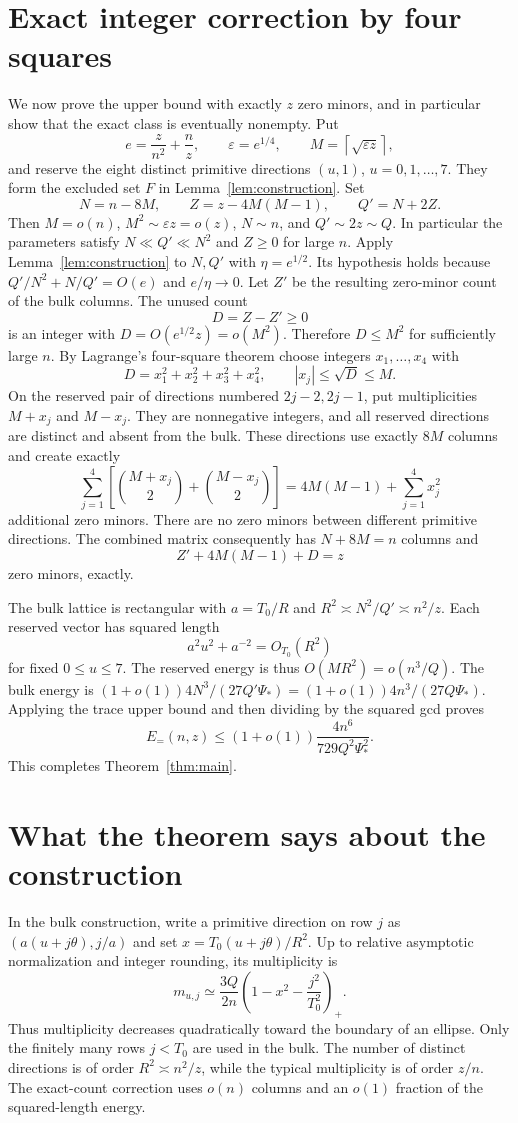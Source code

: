 \documentclass[11pt]{article}
\theoremstyle{remark}\newtheorem{remark}[theorem]{Remark}
\newcommand{\ep}{\varepsilon}
\begin{document}
\section{Exact integer correction by four squares}
We now prove the upper bound with exactly $z$ zero minors, and in particular show that the exact class is eventually nonempty.
Put
\[
 e=\frac{z}{n^2}+\frac{n}{z},\qquad \ep=e^{1/4},\qquad
 M=\left\lceil\sqrt{\ep z}\right\rceil,
\]
and reserve the eight distinct primitive directions $(u,1)$, $u=0,1,\ldots,7$. They form the excluded set $F$ in Lemma~\ref{lem:construction}. Set
\[
 N=n-8M,\qquad Z=z-4M(M-1),\qquad Q'=N+2Z.
\]
Then $M=o(n)$, $M^2\sim\ep z=o(z)$, $N\sim n$, and $Q'\sim2z\sim Q$. In particular the parameters satisfy $N\ll Q'\ll N^2$ and $Z\ge0$ for large $n$. Apply Lemma~\ref{lem:construction} to $N,Q'$ with $\eta=e^{1/2}$. Its hypothesis holds because $Q'/N^2+N/Q'=O(e)$ and $e/\eta\to0$.
Let $Z'$ be the resulting zero-minor count of the bulk columns. The unused count
\[
 D=Z-Z'\ge0
\]
is an integer with $D=O(e^{1/2}z)=o(M^2)$. Therefore $D\le M^2$ for sufficiently large $n$. By Lagrange's four-square theorem choose integers $x_1,\ldots,x_4$ with
\[
 D=x_1^2+x_2^2+x_3^2+x_4^2,
 \qquad |x_j|\le\sqrt D\le M.
\]
On the reserved pair of directions numbered $2j-2,2j-1$, put multiplicities $M+x_j$ and $M-x_j$. They are nonnegative integers, and all reserved directions are distinct and absent from the bulk. These directions use exactly $8M$ columns and create exactly
\[
 \sum_{j=1}^4\left[\binom{M+x_j}{2}+\binom{M-x_j}{2}\right]
 =4M(M-1)+\sum_{j=1}^4x_j^2
\]
additional zero minors. There are no zero minors between different primitive directions. The combined matrix consequently has $N+8M=n$ columns and
\[
 Z'+4M(M-1)+D=z
\]
zero minors, exactly.

The bulk lattice is rectangular with $a=T_0/R$ and $R^2\asymp N^2/Q'\asymp n^2/z$. Each reserved vector has squared length
\[
 a^2u^2+a^{-2}=O_{T_0}(R^2)
\]
for fixed $0\le u\le7$. The reserved energy is thus $O(MR^2)=o(n^3/Q)$. The bulk energy is $(1+o(1))4N^3/(27Q'\Psi_*)=(1+o(1))4n^3/(27Q\Psi_*)$. Applying the trace upper bound and then dividing by the squared gcd proves
\[
 E_=(n,z)\le(1+o(1))\frac{4n^6}{729Q^2\Psi_*^2}.
\]
This completes Theorem~\ref{thm:main}.

\section{What the theorem says about the construction}
In the bulk construction, write a primitive direction on row $j$ as $(a(u+j\theta),j/a)$ and set $x=T_0(u+j\theta)/R^2$. Up to relative asymptotic normalization and integer rounding, its multiplicity is
\[
 m_{u,j}\simeq\frac{3Q}{2n}\left(1-x^2-\frac{j^2}{T_0^2}\right)_+.
\]
Thus multiplicity decreases quadratically toward the boundary of an ellipse. Only the finitely many rows $j<T_0$ are used in the bulk. The number of distinct directions is of order $R^2\asymp n^2/z$, while the typical multiplicity is of order $z/n$. The exact-count correction uses $o(n)$ columns and an $o(1)$ fraction of the squared-length energy.
\end{document}
